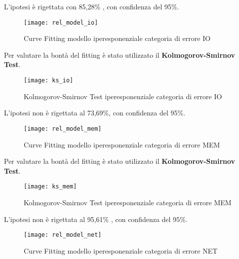 L'ipotesi è rigettata con 85,28\% , con confidenza del 95\%.\\

\clearpage

\begin{figure}[!htbp]
  \centering
  \texttt{[image: rel\_model\_io]}
  \caption{Curve Fitting modello iperesponenziale categoria di errore IO}
  \label{rel_model_io}
\end{figure}

Per valutare la bontà del fitting è stato utilizzato il \textbf{Kolmogorov-Smirnov Test}.\\

\begin{figure}[!htbp]
  \centering
  \texttt{[image: ks\_io]}
  \caption{Kolmogorov-Smirnov Test iperesponenziale categoria di errore IO}
  \label{ks_io}
\end{figure}

L'ipotesi non è rigettata al 73,69\%, con confidenza del 95\%.\\

\clearpage

\begin{figure}[!htbp]
  \centering
  \texttt{[image: rel\_model\_mem]}
  \caption{Curve Fitting modello iperesponenziale categoria di errore MEM}
  \label{rel_model_mem}
\end{figure}

Per valutare la bontà del fitting è stato utilizzato il \textbf{Kolmogorov-Smirnov Test}.\\

\begin{figure}[!htbp]
  \centering
  \texttt{[image: ks\_mem]}
  \caption{Kolmogorov-Smirnov Test iperesponenziale categoria di errore MEM}
  \label{ks_mem}
\end{figure}

L'ipotesi non è rigettata al 95,61\% , con confidenza del 95\%.\\

\clearpage

\begin{figure}[!htbp]
  \centering
  \texttt{[image: rel\_model\_net]}
  \caption{Curve Fitting modello iperesponenziale categoria di errore NET}
  \label{rel_model_net}
\end{figure}

